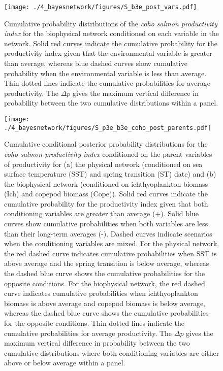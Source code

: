 \begin{figure}[htbp]
  \centering \texttt{[image: ./4\_bayesnetwork/figures/S\_b3e\_post\_vars.pdf]}
  \caption[Cumulative probability distributions of the coho salmon productivity
           index for the biophysical network conditioned on each variable in the
           network]{Cumulative probability distributions of the \emph{coho
           salmon productivity index} for the biophysical network conditioned on
           each variable in the network. Solid red curves indicate the
           cumulative probability for the productivity index given that the
           environmental variable is greater than average, whereas blue
           dashed curves show cumulative probability when the environmental
           variable is less than average. Thin dotted lines indicate the
           cumulative probabilities for average productivity. The \(\Delta p\)
           gives the maximum vertical difference in probability between the two
           cumulative distributions within a panel.}
  \label{fig:bn:s3}
\end{figure}

\begin{figure}[htbp]
  \centering \texttt{[image: ./4\_bayesnetwork/figures/S\_p3e\_b3e\_coho\_post\_parents.pdf]}
  \caption[Cumulative conditional posterior probability distributions for the
           coho salmon productivity index conditioned on the parent variables of
           productivity]{Cumulative conditional posterior probability
           distributions for the \emph{coho salmon productivity index}
           conditioned on the parent variables of productivity for (a) the
           physical network (conditioned on sea surface temperature (SST) and
           spring transition (ST) date) and (b) the biophysical network
           (conditioned on ichthyoplankton biomass (Ich) and copepod biomass
           (Cope)). Solid red curves indicate the cumulative probability
           for the productivity index given that both conditioning variables are
           greater than average (+). Solid blue curves show cumulative
           probabilities when both variables are less than their long-term
           averages (-). Dashed curves indicate scenarios when the
           conditioning variables are mixed. For the physical network, the red
           dashed curve indicates cumulative probabilities when SST is above
           average and the spring transition is below average, whereas the
           dashed blue curve shows the cumulative probabilities for the
           opposite conditions. For the biophysical network, the red dashed
           curve indicates cumulative probabilities when ichthyoplankton biomass
           is above average and copepod biomass is below average, whereas the
           dashed blue curve shows the cumulative probabilities for the
           opposite conditions. Thin dotted lines indicate the cumulative
           probabilities for average productivity. The \(\Delta p\) gives the
           maximum vertical difference in probability between the two cumulative
           distributions where both conditioning variables are either above or
           below average within a panel.}
  \label{fig:bn:s4}
\end{figure}
